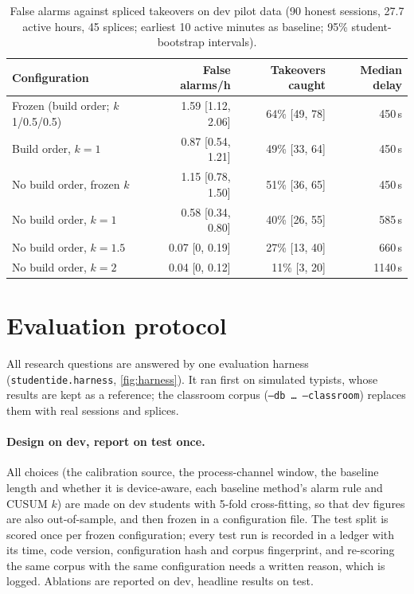 \begin{table}[ht]
  \centering
  \caption{False alarms against spliced takeovers on dev pilot data (90 honest sessions,
    27.7 active hours, 45 splices; earliest 10 active minutes as baseline; 95\% student-bootstrap
    intervals).}
  \label{tab:retune-splice}
  \small
  \begin{tabular}{@{}lrrr@{}}
    \toprule
    Configuration & False alarms/h & Takeovers caught & Median delay \\
    \midrule
    Frozen (build order; $k$ 1/0.5/0.5) & 1.59 [1.12, 2.06] & 64\% [49, 78] & 450\,s \\
    Build order, $k=1$ & 0.87 [0.54, 1.21] & 49\% [33, 64] & 450\,s \\
    No build order, frozen $k$ & 1.15 [0.78, 1.50] & 51\% [36, 65] & 450\,s \\
    No build order, $k=1$ & 0.58 [0.34, 0.80] & 40\% [26, 55] & 585\,s \\
    No build order, $k=1.5$ & 0.07 [0, 0.19] & 27\% [13, 40] & 660\,s \\
    No build order, $k=2$ & 0.04 [0, 0.12] & 11\% [3, 20] & 1140\,s \\
    \bottomrule
  \end{tabular}
\end{table}

\section{Evaluation protocol}
\label{sec:protocol}
All research questions are answered by one evaluation harness
(\texttt{studentide.harness}, \cref{fig:harness}). It ran first on simulated typists,
whose results are kept as a reference; the classroom corpus
(\texttt{--db \dots{} --classroom}) replaces them with real sessions and splices.

\paragraph{Design on dev, report on test once.} All choices (the calibration source,
the process-channel window, the baseline length and whether it is device-aware, each
baseline method's alarm rule and CUSUM $k$) are made on dev students with 5-fold
cross-fitting, so that dev figures are also out-of-sample, and then frozen in a
configuration file. The test split is scored once per frozen configuration; every test
run is recorded in a ledger with its time, code version, configuration hash and corpus
fingerprint, and re-scoring the same corpus with the same configuration needs a written
reason, which is logged. Ablations are reported on dev, headline results on test.


